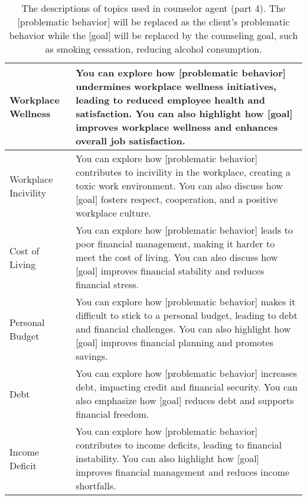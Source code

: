 \begin{table*}[tb]
\begin{tabularx}{\textwidth}{lX}
Workplace Wellness          & You can explore how [problematic behavior] undermines workplace wellness initiatives, leading to reduced employee health and satisfaction. You can also highlight how [goal] improves workplace wellness and enhances overall job satisfaction.                                                                                                                                                                                    \\ \hline
Workplace Incivility        & You can explore how [problematic behavior] contributes to incivility in the workplace, creating a toxic work environment. You can also discuss how [goal] fosters respect, cooperation, and a positive workplace culture.                                                                                                                                                                                                          \\ \hline
Cost of Living              & You can explore how [problematic behavior] leads to poor financial management, making it harder to meet the cost of living. You can also discuss how [goal] improves financial stability and reduces financial stress.                                                                                                                                                                                                             \\ \hline
Personal Budget             & You can explore how [problematic behavior] makes it difficult to stick to a personal budget, leading to debt and financial challenges. You can also highlight how [goal] improves financial planning and promotes savings.                                                                                                                                                                                                         \\ \hline
Debt                        & You can explore how [problematic behavior] increases debt, impacting credit and financial security. You can also emphasize how [goal] reduces debt and supports financial freedom.                                                                                                                                                                                                                                                 \\ \hline
Income Deficit              & You can explore how [problematic behavior] contributes to income deficits, leading to financial instability. You can also highlight how [goal] improves financial management and reduces income shortfalls. 
\\ \bottomrule
\end{tabularx}
\caption{The descriptions of topics used in counselor agent (part 4). The [problematic behavior] will be replaced as the client's problematic behavior while the [goal] will be replaced by the counseling goal, such as smoking cessation, reducing alcohol consumption.}
\label{tab:counselor topic description 4}
\end{table*}             

